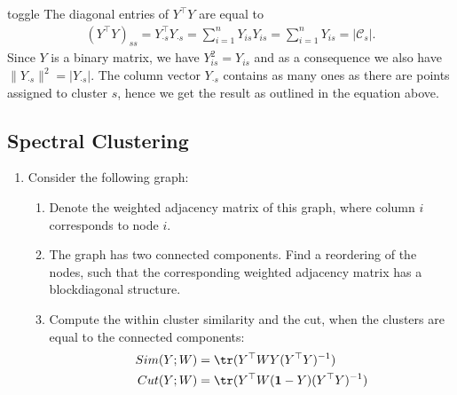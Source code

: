 \documentclass[letterpaper,10pt,english]{jupyterBook}
\begin{document}
\begin{enumerate}
\begin{sphinxuseclass}{toggle}
\sphinxAtStartPar
The diagonal entries of \(Y^\top Y\) are equal to
\begin{align*}
(Y^\top Y)_{ss} = Y_{\cdot s}^\top Y_{\cdot s} = \sum_{i=1}^n Y_{is}Y_{is} = \sum_{i=1}^n Y_{is} = \lvert\mathcal{C}_s\rvert.
\end{align*}
\sphinxAtStartPar
Since \(Y\) is a binary matrix, we have \(Y_{is}^2 = Y_{is}\) and as a consequence we also have \(\lVert Y_{\cdot s}\rVert^2 =\lvert Y_{\cdot s}\rvert\). The column vector \(Y_{\cdot s}\) contains as many ones as there are points assigned to cluster \(s\), hence we get the result as outlined in the equation above.

\end{sphinxuseclass}
\end{enumerate}


\subsection{Spectral Clustering}
\label{\detokenize{clustering_exercises:spectral-clustering}}\begin{enumerate}
%
\item {} 
\sphinxAtStartPar
Consider the following graph:
\begin{center}\end{center}\begin{enumerate}
%
\item {} 
\sphinxAtStartPar
Denote the weighted adjacency matrix of this graph, where column \(i\) corresponds to node \(i\).

\item {} 
\sphinxAtStartPar
The graph has two connected components. Find a reordering of the  nodes, such that the corresponding weighted adjacency matrix has a block\sphinxhyphen{}diagonal structure.

\item {} 
\sphinxAtStartPar
Compute the within cluster similarity and the cut, when the clusters are equal to the connected components:
\begin{align*}
        Sim(Y;W) &= \tr(Y^\top W Y (Y^\top Y)^{-1})\\
        Cut(Y;W) & = \tr(Y^\top W (\mathbf{1}-Y) (Y^\top Y)^{-1})
        \end{align*}
\end{enumerate}

\end{enumerate}
\end{document}
